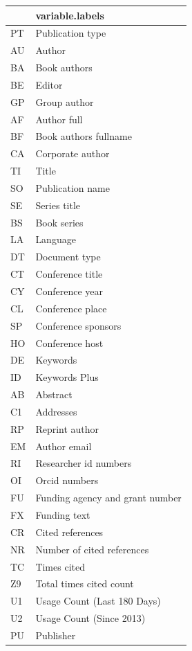 \documentclass[]{book}
\begin{document}
\begin{tabular}{l|l}
\hline
  & variable.labels\\
\hline
PT & Publication type\\
\hline
AU & Author\\
\hline
BA & Book authors\\
\hline
BE & Editor\\
\hline
GP & Group author\\
\hline
AF & Author full\\
\hline
BF & Book authors fullname\\
\hline
CA & Corporate author\\
\hline
TI & Title\\
\hline
SO & Publication name\\
\hline
SE & Series title\\
\hline
BS & Book series\\
\hline
LA & Language\\
\hline
DT & Document type\\
\hline
CT & Conference title\\
\hline
CY & Conference year\\
\hline
CL & Conference place\\
\hline
SP & Conference sponsors\\
\hline
HO & Conference host\\
\hline
DE & Keywords\\
\hline
ID & Keywords Plus\\
\hline
AB & Abstract\\
\hline
C1 & Addresses\\
\hline
RP & Reprint author\\
\hline
EM & Author email\\
\hline
RI & Researcher id numbers\\
\hline
OI & Orcid numbers\\
\hline
FU & Funding agency and grant number\\
\hline
FX & Funding text\\
\hline
CR & Cited references\\
\hline
NR & Number of cited references\\
\hline
TC & Times cited\\
\hline
Z9 & Total times cited count\\
\hline
U1 & Usage Count (Last 180 Days)\\
\hline
U2 & Usage Count (Since 2013)\\
\hline
PU & Publisher\\

\end{tabular}
\end{document}
